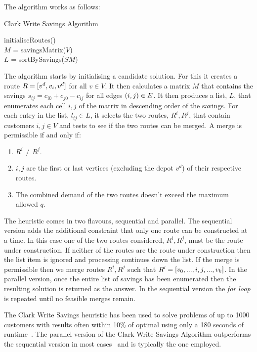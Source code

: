 The algorithm works as follows:

\begin{algorithm}[H]
   \caption{Clark Write Savings Algorithm}
   initialiseRoutes()\\
   $M$ = savingsMatrix($V$)\\
   $L$ = sortBySavings($SM$)\\
\end{algorithm}

The algorithm starts by initialising a candidate solution. For this it creates a route $R = [v^d, v_i, v^d]$ for all $v \in V$. It then calculates a matrix $M$ that contains the savings $s_{ij} = c_{i0} + c_{j0} - c_{ij}$ for all edges $(i,j) \in E$. It then produces a list, $L$, that enumerates each cell $i,j$ of the matrix in descending order of the savings. For each entry in the list, $l_{ij} \in L$, it selects the two routes, $R^i, R^j$, that contain customers $i,j \in V$ and tests to see if the two routes can be merged. A merge is permissible if and only if:

\begin{enumerate}
   \item $R^i \neq R^j$.
   \item $i,j$ are the first or last vertices (excluding the depot $v^d$) of their respective routes.
   \item The combined demand of the two routes doesn't exceed the maximum allowed $q$.
\end{enumerate}

The heuristic comes in two flavours, sequential and parallel. The sequential version adds the additional constraint that only one route can be constructed at a time. In this case one of the two routes considered, $R^i, R^j$, must be the route under construction. If neither of the routes are the route under construction then the list item is ignored and processing continues down the list. If the merge is permissible then we merge routes $R^i, R^j$ such that $R' = [v_0,...,i,j,...,v_k]$. In the parallel version, once the entire list of savings has been enumerated then the resulting solution is returned as the answer. In the sequential version the \emph{for loop} is repeated until no feasible merges remain.

The Clark Write Savings heuristic has been used to solve problems of up to 1000 customers with results often within 10\% of optimal using only a 180 seconds of runtime~\cite{TV2001}. The parallel version of the Clark Write Savings Algorithm outperforms the sequential version in most cases~\cite{Laporte:1999} and is typically the one employed.

